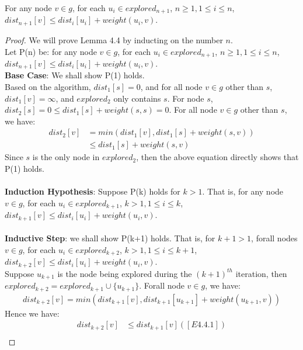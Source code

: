 \begin{sublemma}
For any node $v \in g$, for each $u_i \in explored_{n+1}$, $n \geq 1, 1 \leq i \leq n$, $dist_{n+1}[v] \leq dist_i[u_i] + weight(u_i, v)$. 
\end{sublemma}
\begin{proof}
We will prove Lemma 4.4 by inducting on the number $n$. 
\\
Let P(n) be: for any node $v \in g$, for each $u_i \in explored_{n+1}$, $n \geq 1, 1 \leq i \leq n$, $dist_{n+1}[v] \leq dist_i[u_i] + weight(u_i, v)$. 
\\
\textbf{Base Case}: We shall show P(1) holds. 
\\
Based on the algorithm, $dist_1[s] = 0$, and for all node $v \in g$ other than $s$, $dist_1[v] = \infty$, and $explored_2$ only contains $s$. For node $s$, $dist_2[s] = 0 \leq dist_1[s] + weight(s, s) = 0$. For all node $v \in g$ other than $s$, we have: 
\begin{align*}
      dist_2[v] &= min(dist_1[v], dist_1[s] + weight(s, v)) \\
                &\leq dist_1[s] + weight(s, v)
\end{align*}
Since $s$ is the only node in $explored_2$, then the above equation directly shows that P(1) holds. 
\\\\
\textbf{Induction Hypothesis}: Suppose P(k) holds for $k > 1$. That is, for any node $v \in g$, for each $u_i \in explored_{k+1}$, $k > 1, 1 \leq i \leq k$, $dist_{k+1}[v] \leq dist_i[u_i] + weight(u_i, v)$. 
\\\\
\textbf{Inductive Step}: we shall show P(k+1) holds. That is,  for $k+1 > 1$, forall nodes $v \in g$,  for each $u_i \in explored_{k+2}$, $k > 1, 1 \leq i \leq k+1$, $dist_{k+2}[v] \leq dist_i[u_i] + weight(u_i, v)$. 
\\
Suppose $u_{k+1}$ is the node being explored during the $(k+1)^{th}$ iteration, then $explored_{k+2} = explored_{k+1} \cup \{u_{k+1}\}$. Forall node $v \in g$, we have: 
\begin{align*}
  dist_{k+2}[v] = min(dist_{k+1}[v], dist_{k+1}[u_{k+1}] + weight(u_{k+1}, v))
\end{align*}
Hence we have: 
\begin{align*}
  dist_{k+2}[v] &\leq dist_{k+1}[v] ([E4.4.1])\\

\end{align*}
\end{proof}
